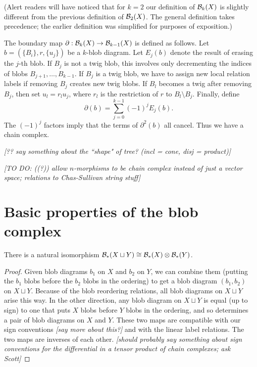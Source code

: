 \documentclass[11pt,leqno]{article}
\def\bc{{\cal B}}
\def\du{\sqcup}
\def\bd{\partial}
\def\setmin{\setminus}
\def\nn#1{{{\it \small [#1]}}}
\newcommand{\eq}[1]{\begin{displaymath}#1\end{displaymath}}
\begin{document}
(Alert readers will have noticed that for $k=2$ our definition
of $\bc_k(X)$ is slightly different from the previous definition
of $\bc_2(X)$.
The general definition takes precedence;
the earlier definition was simplified for purposes of exposition.)

The boundary map $\bd : \bc_k(X) \to \bc_{k-1}(X)$ is defined as follows.
Let $b = (\{B_i\}, r, \{u_j\})$ be a $k$-blob diagram.
Let $E_j(b)$ denote the result of erasing the $j$-th blob.
If $B_j$ is not a twig blob, this involves only decrementing
the indices of blobs $B_{j+1},\ldots,B_{k-1}$.
If $B_j$ is a twig blob, we have to assign new local relation labels
if removing $B_j$ creates new twig blobs.
If $B_l$ becomes a twig after removing $B_j$, then set $u_l = r_lu_j$,
where $r_l$ is the restriction of $r$ to $B_l \setmin B_j$.
Finally, define
\eq{
	\bd(b) = \sum_{j=0}^{k-1} (-1)^j E_j(b).
}
The $(-1)^j$ factors imply that the terms of $\bd^2(b)$ all cancel.
Thus we have a chain complex.

\nn{?? say something about the ``shape" of tree? (incl = cone, disj = product)}


\nn{TO DO: ((?)) allow $n$-morphisms to be chain complex instead of just
a vector space; relations to Chas-Sullivan string stuff}



\section{Basic properties of the blob complex}

\begin{prop} \label{disjunion}
There is a natural isomorphism $\bc_*(X \du Y) \cong \bc_*(X) \otimes \bc_*(Y)$.
\end{prop}
\begin{proof}
Given blob diagrams $b_1$ on $X$ and $b_2$ on $Y$, we can combine them
(putting the $b_1$ blobs before the $b_2$ blobs in the ordering) to get a 
blob diagram $(b_1, b_2)$ on $X \du Y$.
Because of the blob reordering relations, all blob diagrams on $X \du Y$ arise this way.
In the other direction, any blob diagram on $X\du Y$ is equal (up to sign)
to one that puts $X$ blobs before $Y$ blobs in the ordering, and so determines
a pair of blob diagrams on $X$ and $Y$.
These two maps are compatible with our sign conventions \nn{say more about this?} and
with the linear label relations.
The two maps are inverses of each other.
\nn{should probably say something about sign conventions for the differential
in a tensor product of chain complexes; ask Scott}
\end{proof}
\end{document}
